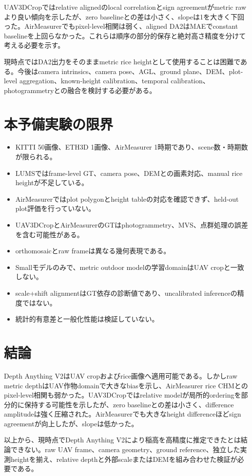 \documentclass[a4paper,11pt]{ltjsarticle}
\begin{document}
UAV3DCropではrelative alignedのlocal correlationとsign agreementがmetric rawより良い傾向を示したが、zero baselineとの差は小さく、slopeは1を大きく下回った。AirMeasurerでもpixel-level相関は弱く、aligned DA2はMAEでconstant baselineを上回らなかった。これらは順序の部分的保存と絶対高さ精度を分けて考える必要を示す。

現時点ではDA2出力をそのままmetric rice heightとして使用することは困難である。今後はcamera intrinsics、camera pose、AGL、ground plane、DEM、plot-level aggregation、known-height calibration、temporal calibration、photogrammetryとの融合を検討する必要がある。

\section{本予備実験の限界}
\begin{itemize}
\item KITTI 50画像、ETH3D 1画像、AirMeasurer 1時期であり、scene数・時期数が限られる。
\item LUMSではframe-level GT、camera pose、DEMとの画素対応、manual rice heightが不足している。
\item AirMeasurerではplot polygonとheight tableの対応を確認できず、held-out plot評価を行っていない。
\item UAV3DCropとAirMeasurerのGTはphotogrammetry、MVS、点群処理の誤差を含む可能性がある。
\item orthomosaicとraw frameは異なる幾何表現である。
\item Smallモデルのみで、metric outdoor modelの学習domainはUAV cropと一致しない。
\item scale+shift alignmentはGT依存の診断値であり、uncalibrated inferenceの精度ではない。
\item 統計的有意差と一般化性能は検証していない。
\end{itemize}

\section{結論}
Depth Anything V2はUAV cropおよびrice画像へ適用可能である。しかしraw metric depthはUAV作物domainで大きなbiasを示し、AirMeasurer rice CHMとのpixel-level相関も弱かった。UAV3DCropではrelative modelが局所的orderingを部分的に保持する可能性を示したが、zero baselineとの差は小さく、difference amplitudeは強く圧縮された。AirMeasurerでも大きなheight differenceほどsign agreementが向上したが、slopeは低かった。

以上から、現時点でDepth Anything V2により稲高を高精度に推定できたとは結論できない。raw UAV frame、camera geometry、ground reference、独立した実測heightを揃え、relative depthと外部scaleまたはDEMを組み合わせた検証が必要である。
\end{document}
